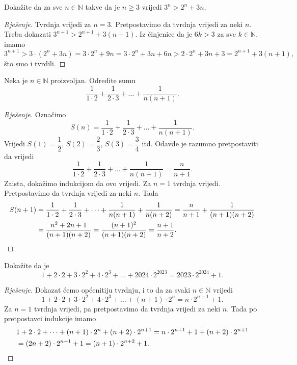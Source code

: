 \begin{exercise}
Dokažite da za sve $n\in \mathbb{N}$ takve da je $n\geq 3$ vrijedi $3^n>2^n+3n$.
\end{exercise}
\begin{proof}[Rješenje]
Tvrdnja vrijedi za $n=3$. Pretpostavimo da tvrdnja vrijedi za neki $n$. Treba dokazati $3^{n+1}>2^{n+1}+3(n+1)$. Iz činjenice da je $6k>3$ za sve $k\in \mathbb{N}$, imamo
$$3^{n+1}>3\cdot (2^n+3n)=3\cdot 2^n+9n=3\cdot 2^n+3n+6n>2\cdot 2^n+3n+3=2^{n+1}+3(n+1),$$
što smo i tvrdili.
\end{proof}
\begin{exercise}
Neka je $n\in \mathbb{N}$ proizvoljan. Odredite sumu
$$\dfrac{1}{1\cdot 2}+\dfrac{1}{2\cdot 3}+\dots+\dfrac{1}{n(n+1)}.$$
\end{exercise}
\begin{proof}[Rješenje]
Označimo
$$S(n)=\dfrac{1}{1\cdot 2}+\dfrac{1}{2\cdot 3}+\dots+\dfrac{1}{n(n+1)}.$$
Vrijedi $S(1)=\dfrac{1}{2}$, $S(2)=\dfrac{2}{3}$, $S(3)=\dfrac{3}{4}$ itd. Odavde je razumno pretpostaviti da vrijedi
$$\dfrac{1}{1\cdot 2}+\dfrac{1}{2\cdot 3}+\dots+\dfrac{1}{n(n+1)}=\dfrac{n}{n+1}.$$
Zaista, dokažimo indukcijom da ovo vrijedi. Za $n=1$ tvrdnja vrijedi. Pretpostavimo da tvrdnja vrijedi za neki $n$. Tada
\begin{align*}
S(n+1)&=\dfrac{1}{1\cdot 2}+\dfrac{1}{2\cdot 3}+\dots+\dfrac{1}{n(n+1)}+\dfrac{1}{n(n+2)}=\dfrac{n}{n+1}+\dfrac{1}{(n+1)(n+2)}\\
&=\dfrac{n^2+2n+1}{(n+1)(n+2)}=\dfrac{(n+1)^2}{(n+1)(n+2)}=\dfrac{n+1}{n+2}.
\qedhere
\end{align*}
\end{proof}
\begin{exercise}
Dokažite da je
$$1+2\cdot 2+3\cdot 2^2+4\cdot 2^3+\dots+2024\cdot 2^{2023}=2023\cdot 2^{2024}+1.$$
\end{exercise}
\begin{proof}[Rješenje]
Dokazat ćemo općenitiju tvrdnju, i to da za svaki $n\in \mathbb{N}$ vrijedi
$$1+2\cdot 2+3\cdot 2^2+4\cdot 2^3+\dots+(n+1)\cdot 2^{n}=n\cdot 2^{n+1}+1.$$
Za $n=1$ tvrdnja vrijedi, pa pretpostavimo da tvrdnja vrijedi za neki $n$. Tada po pretpostavci indukcije imamo
\begin{align*}
&1+2\cdot 2+\dots+(n+1)\cdot 2^{n}+(n+2)\cdot 2^{n+1}=n\cdot 2^{n+1}+1+(n+2)\cdot 2^{n+1}\\
&=(2n+2)\cdot 2^{n+1}+1=(n+1)\cdot 2^{n+2}+1.\qedhere
\end{align*}
\end{proof}
\newpage
